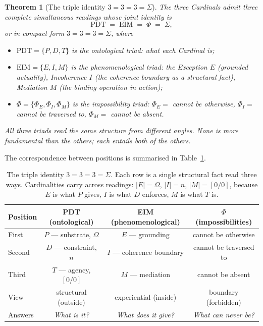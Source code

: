 \documentclass[11pt,a4paper]{article}
\newtheorem{theorem}{Theorem}[section]
\theoremstyle{definition}
\theoremstyle{remark}
\begin{document}
\begin{theorem}[The triple identity $3=3=3=\Sigma$]\label{thm:triads}
The three Cardinals admit three complete simultaneous readings whose joint identity is
\[
\boxed{\;\mathrm{PDT} \;=\; \mathrm{EIM} \;=\; \Phi \;=\; \Sigma,\;}
\]
or in compact form $3=3=3=\Sigma$, where
\begin{itemize}[leftmargin=*]
\item $\mathrm{PDT} = \{P,D,T\}$ is the \emph{ontological} triad: what each Cardinal is;
\item $\mathrm{EIM} = \{E,I,M\}$ is the \emph{phenomenological} triad: the Exception $E$ (grounded actuality), Incoherence $I$ (the coherence boundary as a structural fact), Mediation $M$ (the binding operation in action);
\item $\Phi = \{\Phi_{E},\Phi_{I},\Phi_{M}\}$ is the \emph{impossibility} triad: $\Phi_{E} = $ \textit{cannot be otherwise}, $\Phi_{I} = $ \textit{cannot be traversed to}, $\Phi_{M} = $ \textit{cannot be absent}.
\end{itemize}
All three triads read the same structure from different angles. None is more fundamental than the others; each entails both of the others.
\end{theorem}

The correspondence between positions is summarised in Table~\ref{tab:triads}.

\begin{table}[h]
\centering
\begin{tabular}{@{}l c c c@{}}
\toprule
Position & PDT (ontological) & EIM (phenomenological) & $\Phi$ (impossibilities)\\
\midrule
First & $P$ --- substrate, $\Omega$ & $E$ --- grounding & cannot be otherwise\\
Second & $D$ --- constraint, $n$ & $I$ --- coherence boundary & cannot be traversed to\\
Third & $T$ --- agency, $[0/0]$ & $M$ --- mediation & cannot be absent\\
\addlinespace
View & structural (outside) & experiential (inside) & boundary (forbidden)\\
Answers & \textit{What is it?} & \textit{What does it give?} & \textit{What can never be?}\\
\bottomrule
\end{tabular}
\caption{The triple identity $3=3=3=\Sigma$. Each row is a single structural fact read three ways. Cardinalities carry across readings: $|E|=\Omega$, $|I|=n$, $|M|=[0/0]$, because $E$ is what $P$ gives, $I$ is what $D$ enforces, $M$ is what $T$ is.}
\label{tab:triads}
\end{table}
\end{document}
